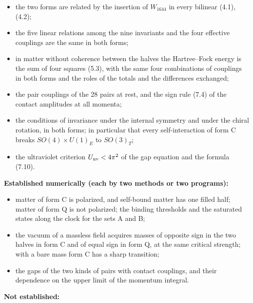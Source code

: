 \documentclass[
  10pt,
]{article}
\providecommand{\tightlist}{%
  \setlength{\itemsep}{0pt}\setlength{\parskip}{0pt}}
\begin{document}
\begin{itemize}
\tightlist
\item
  the two forms are related by the insertion of \(W_{1644}\) in every
  bilinear (4.1), (4.2);
\item
  the five linear relations among the nine invariants and the four
  effective couplings are the same in both forms;
\item
  in matter without coherence between the halves the Hartree--Fock
  energy is the sum of four squares (5.3), with the same four
  combinations of couplings in both forms and the roles of the totals
  and the differences exchanged;
\item
  the pair couplings of the 28 pairs at rest, and the sign rule (7.4) of
  the contact amplitudes at all momenta;
\item
  the conditions of invariance under the internal symmetry and under the
  chiral rotation, in both forms; in particular that every
  self-interaction of form C breaks \(SO(4)\times U(1)_E\) to
  \(SO(3)_T\);
\item
  the ultraviolet criterion \(U_{\rm uv}<4\pi^2\) of the gap equation
  and the formula (7.10).
\end{itemize}

\textbf{Established numerically (each by two methods or two programs):}

\begin{itemize}
\tightlist
\item
  matter of form C is polarized, and self-bound matter has one filled
  half; matter of form Q is not polarized; the binding thresholds and
  the saturated states along the clock for the sets A and B;
\item
  the vacuum of a massless field acquires masses of opposite sign in the
  two halves in form C and of equal sign in form Q, at the same critical
  strength; with a bare mass form C has a sharp transition;
\item
  the gaps of the two kinds of pairs with contact couplings, and their
  dependence on the upper limit of the momentum integral.
\end{itemize}

\textbf{Not established:}
\end{document}
